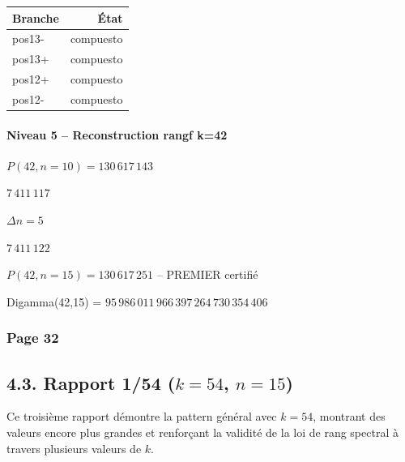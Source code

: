 \begin{center}
\begin{tabular}{@{}lr@{}}
\toprule
\rowcolor{spectralgris}
\textbf{Branche} & \textbf{État} \\
\midrule
pos13- & compuesto \\
pos13+ & compuesto \\
pos12+ & compuesto \\
pos12- & compuesto \\
\bottomrule
\end{tabular}
\end{center}

\vspace{0.3cm}

\paragraph{Niveau 5 -- Reconstruction rangf k=42}

\begin{boitealgo}[Reconstruction rangf -- k=42]
\begin{description}[nosep]
  \item[Ancrage] $P(42, n=10) = 130\,617\,143$
  \item[Rang de base] $7\,411\,117$
  \item[Écart] $\Delta n = 5$
  \item[Rang cible] $7\,411\,122$
  \item[Résultat] $P(42, n=15) = 130\,617\,251$ -- \textcolor{vert}{PREMIER certifié}
\end{description}
\end{boitealgo}

Digamma(42,15) = $95\,986\,011\,966\,397\,264\,730\,354\,406$

\vspace{0.5cm}


\subsubsection*{Page 32}

\subsection*{4.3. Rapport 1/54 ($k = 54$, $n = 15$)}

Ce troisième rapport démontre la pattern général avec $k=54$, montrant des valeurs encore plus grandes et renforçant la validité de la loi de rang spectral à travers plusieurs valeurs de $k$.


